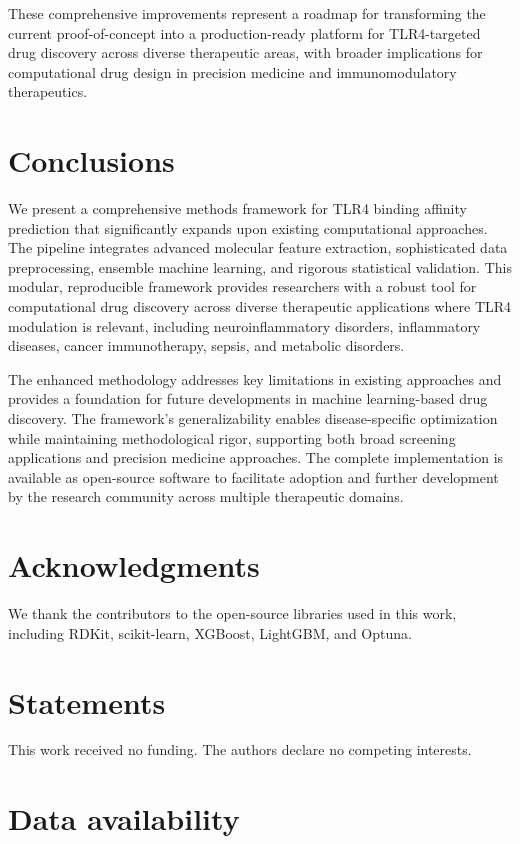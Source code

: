 \documentclass[preprint, 10pt]{elsarticle}
\begin{document}
These comprehensive improvements represent a roadmap for transforming the current proof-of-concept into a production-ready platform for TLR4-targeted drug discovery across diverse therapeutic areas, with broader implications for computational drug design in precision medicine and immunomodulatory therapeutics.

\section{Conclusions}

We present a comprehensive methods framework for TLR4 binding affinity prediction that significantly expands upon existing computational approaches. The pipeline integrates advanced molecular feature extraction, sophisticated data preprocessing, ensemble machine learning, and rigorous statistical validation. This modular, reproducible framework provides researchers with a robust tool for computational drug discovery across diverse therapeutic applications where TLR4 modulation is relevant, including neuroinflammatory disorders, inflammatory diseases, cancer immunotherapy, sepsis, and metabolic disorders.

The enhanced methodology addresses key limitations in existing approaches and provides a foundation for future developments in machine learning-based drug discovery. The framework's generalizability enables disease-specific optimization while maintaining methodological rigor, supporting both broad screening applications and precision medicine approaches. The complete implementation is available as open-source software to facilitate adoption and further development by the research community across multiple therapeutic domains.

\section*{Acknowledgments}

We thank the contributors to the open-source libraries used in this work, including RDKit, scikit-learn, XGBoost, LightGBM, and Optuna.

\section*{Statements}

This work received no funding. The authors declare no competing interests.

\section*{Data availability}
\end{document}
